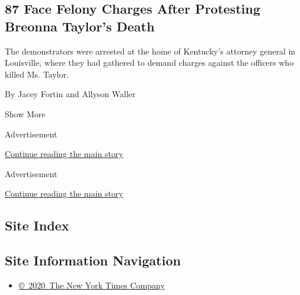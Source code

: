 \begin{enumerate}
  \hypertarget{87-face-felony-charges-after-protesting-breonna-taylors-death}{%
  \subsection{87 Face Felony Charges After Protesting Breonna Taylor's
  Death}\label{87-face-felony-charges-after-protesting-breonna-taylors-death}}

  The demonstrators were arrested at the home of Kentucky's attorney
  general in Louisville, where they had gathered to demand charges
  against the officers who killed Ms. Taylor.

  By Jacey Fortin and Allyson Waller
\end{enumerate}

Show More

Advertisement

\protect\hyperlink{after-mid1}{Continue reading the main story}

Advertisement

\protect\hyperlink{after-mktg}{Continue reading the main story}

\hypertarget{site-index}{%
\subsection{Site Index}\label{site-index}}

\hypertarget{site-information-navigation}{%
\subsection{Site Information
Navigation}\label{site-information-navigation}}

\begin{itemize}
\tightlist
\item
  \href{https://help.nytimes3xbfgragh.onion/hc/en-us/articles/115014792127-Copyright-notice}{©~2020~The
  New York Times Company}
\end{itemize}

